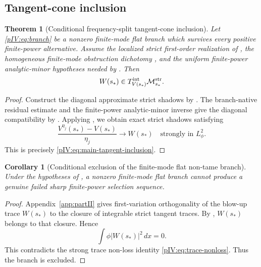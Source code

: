 \documentclass[11pt]{article}
\numberwithin{equation}{section}
\theoremstyle{plain}
\newtheorem{theorem}{Theorem}[section]
\newtheorem{corollary}{Corollary}[section]
\theoremstyle{definition}
\theoremstyle{remark}
\newcommand{\dx}{\,dx}
\newcommand{\Mstr}{\mathcal M^{\rm str}}
\newcommand{\Tint}{T^{\rm int}}
\begin{document}
\subsection{Tangent-cone inclusion}
\label{pIV:sec:diagonal}

\begin{theorem}[Conditional frequency-split tangent-cone inclusion]
\label{pIV:thm:frequency-split-inclusion}
Let \eqref{pIV:eq:branch} be a nonzero finite-mode flat branch which survives every
positive finite-power alternative. Assume the localized strict first-order realization
of , the homogeneous finite-mode obstruction
dichotomy , and the uniform finite-power analytic-minor hypotheses needed by
.
Then
\begin{equation}\label{pIV:eq:main-tangent-inclusion}
        W(s_*)\in\Tint_{V(s_*)}\Mstr_{s_*}.
\end{equation}
\end{theorem}

\begin{proof}
Construct the diagonal approximate strict shadows by .
The branch-native residual estimate and the finite-power analytic-minor inverse give the
diagonal compatibility by . Applying
, we obtain exact strict shadows satisfying
\[
        \frac{V^{\eta_j}(s_*)-V(s_*)}{\eta_j}
        \to W(s_*)
        \quad\text{strongly in }L^2_\phi.
\]
This is precisely \eqref{pIV:eq:main-tangent-inclusion}.
\end{proof}

\begin{corollary}[Conditional exclusion of the finite-mode flat non-tame branch]
\label{pIV:cor:exclude-flat-branch}
Under the hypotheses of , a nonzero finite-mode flat branch cannot produce a genuine failed sharp finite-power
selection sequence.
\end{corollary}

\begin{proof}
Appendix~\ref{app:partII} gives first-variation orthogonality of the blow-up trace \(W(s_*)\) to the
closure of integrable strict tangent traces. By ,
\(W(s_*)\) belongs to that closure. Hence
\[
        \int \phi |W(s_*)|^2\dx=0.
\]
This contradicts the strong trace non-loss identity \eqref{pIV:eq:trace-nonloss}. Thus
the branch is excluded.
\end{proof}
\end{document}
